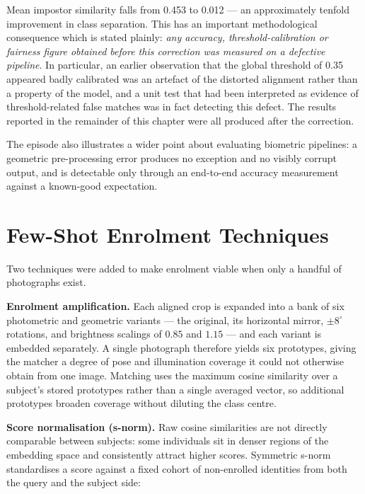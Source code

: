 \documentclass[12pt,a4paper]{report}
\begin{document}
Mean impostor similarity falls from 0.453 to 0.012 --- an approximately tenfold
improvement in class separation. This has an important methodological consequence
which is stated plainly: \emph{any accuracy, threshold-calibration or fairness
figure obtained before this correction was measured on a defective pipeline}. In
particular, an earlier observation that the global threshold of 0.35 appeared
badly calibrated was an artefact of the distorted alignment rather than a property
of the model, and a unit test that had been interpreted as evidence of
threshold-related false matches was in fact detecting this defect. The results
reported in the remainder of this chapter were all produced after the correction.

The episode also illustrates a wider point about evaluating biometric pipelines:
a geometric pre-processing error produces no exception and no visibly corrupt
output, and is detectable only through an end-to-end accuracy measurement against
a known-good expectation.

\section{Few-Shot Enrolment Techniques}
\label{sec:fewshot-methods}

Two techniques were added to make enrolment viable when only a handful of
photographs exist.

\textbf{Enrolment amplification.} Each aligned crop is expanded into a bank of six
photometric and geometric variants --- the original, its horizontal mirror,
$\pm 8^{\circ}$ rotations, and brightness scalings of $0.85$ and $1.15$ --- and
each variant is embedded separately. A single photograph therefore yields six
prototypes, giving the matcher a degree of pose and illumination coverage it could
not otherwise obtain from one image. Matching uses the maximum cosine similarity
over a subject's stored prototypes rather than a single averaged vector, so
additional prototypes broaden coverage without diluting the class centre.

\textbf{Score normalisation (s-norm).} Raw cosine similarities are not directly
comparable between subjects: some individuals sit in denser regions of the
embedding space and consistently attract higher scores. Symmetric s-norm
standardises a score against a fixed cohort of non-enrolled identities from both
the query and the subject side:
\end{document}
